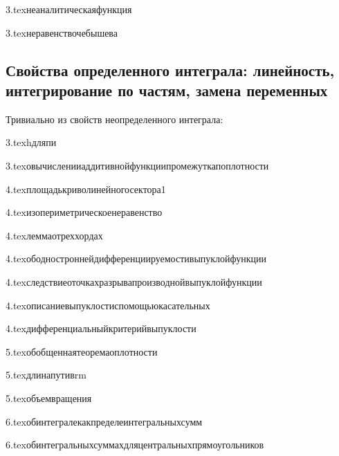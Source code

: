 {3.tex}{неаналитическаяфункция}

{3.tex}{неравенствочебышева}

\subsection{Свойства определенного интеграла: линейность, интегрирование по частям, замена переменных}
Тривиально из свойств неопределенного интеграла: 

{3.tex}{hдляпи}

{3.tex}{овычисленииаддитивнойфункциипромежуткапоплотности}

{4.tex}{площадькриволинейногосектора1}

{4.tex}{изопериметрическоенеравенство}

{4.tex}{леммаотреххордах}

{4.tex}{ободностроннейдифференциируемостивыпуклойфункции}

{4.tex}{следствиеоточкахразрывапроизводнойвыпуклойфункции}

{4.tex}{описаниевыпуклостиспомощьюкасательных}

{4.tex}{дифференциальныйкритерийвыпуклости}

{5.tex}{обобщеннаятеоремаоплотности}

{5.tex}{длинапутивrm}

{5.tex}{объемвращения}

{6.tex}{обинтегралекакпределеинтегральныхсумм}

{6.tex}{обинтегральныхсуммахдляцентральныхпрямоугольников}

